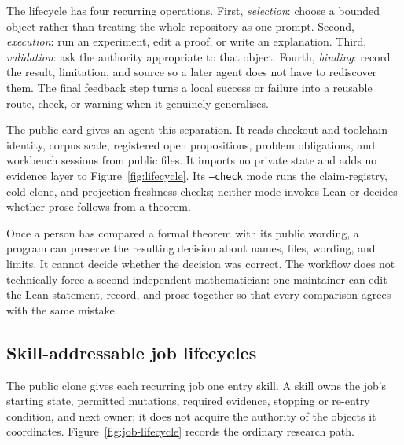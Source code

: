 \documentclass[10pt]{article}
\begin{document}
The lifecycle has four recurring operations. First, \emph{selection}: choose a
bounded object rather than treating the whole repository as one prompt.
Second, \emph{execution}: run an experiment, edit a proof, or write an
explanation. Third, \emph{validation}: ask the authority appropriate to that
object. Fourth, \emph{binding}: record the result, limitation, and source so a
later agent does not have to rediscover them. The final feedback step turns a
local success or failure into a reusable route, check, or warning when it
genuinely generalises.

The public  card gives an agent this separation.
It reads checkout and toolchain
identity, corpus scale, registered open propositions, problem obligations, and
workbench sessions from public files.  It imports no private state and adds no
evidence layer to Figure~\ref{fig:lifecycle}.  Its \texttt{--check} mode
runs the claim-registry, cold-clone, and projection-freshness checks; neither
mode invokes Lean or decides whether prose follows from a theorem.

Once a person has compared a formal theorem with its public wording, a program
can preserve the resulting decision about names, files, wording, and limits.
It cannot decide whether the decision was correct.  The workflow does not
technically force a second independent mathematician: one maintainer can edit
the Lean statement, record, and prose together so that every comparison agrees
with the same mistake.
\subsection{Skill-addressable job lifecycles}

The public clone gives each recurring job one entry skill. A skill owns the
job's starting state, permitted mutations, required evidence, stopping or
re-entry condition, and next owner; it does not acquire the authority of the
objects it coordinates. Figure~\ref{fig:job-lifecycle} records the ordinary
research path.
\end{document}
